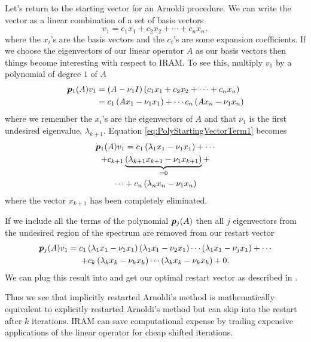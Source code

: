 Let's return to the starting vector for an Arnoldi procedure.  We can write the vector as a linear combination of a set of basis vectors
\begin{equation}
    v_1 = c_1x_1 + c_2x_2 + \cdots + c_nx_n,
\end{equation}
where the $x_i$'s are the basis vectors and the $c_i$'s are some expansion coefficients.  If we choose the eigenvectors of our linear operator $A$ as our basis vectors then things become interesting with respect to IRAM.  To see this, multiply $v_1$ by a polynomial of degree $1$ of $A$
\begin{equation}
    \begin{split}
        \bm{p}_1(A)v_1 &= \left(A-\nu_1I\right)\left(c_1x_1 + c_2x_2 + \cdots + c_nx_n\right) \\
         &= c_1\left(Ax_1 - \nu_1x_1\right) + \cdots c_n\left(Ax_n - \nu_1x_n\right)
    \end{split}
        \label{eq:PolyStartingVectorTerm1}
\end{equation}
where we remember the $x_i$'s are the eigenvectors of $A$ and that $\nu_1$ is the first undesired eigenvalue, $\lambda_{k+1}$.  Equation \eqref{eq:PolyStartingVectorTerm1} becomes
\begin{multline}
    \bm{p}_1(A)v_1 = c_1\left(\lambda_1x_1 - \nu_1x_1\right) + \cdots \\
    +c_{k+1}\underbrace{\left(\lambda_{k+1}x_{k+1} - \nu_1x_{k+1}\right)}_{=0} + \\
    \cdots + c_n\left(\lambda_nx_n - \nu_1x_n\right)
\end{multline}
where the vector $x_{k+1}$ has been completely eliminated.  

If we include all the terms of the polynomial $\bm{p}_j(A)$ then all $j$ eigenvectors from the undesired region of the spectrum are removed from our restart vector
\begin{multline}
    \bm{p}_j(A)v_1 = c_1\left(\lambda_1x_1 - \nu_1x_1\right)\left(\lambda_1x_1 - \nu_2x_1\right)\cdots\left(\lambda_1x_1 - \nu_jx_1\right) + \cdots \\
    + c_k\left(\lambda_kx_k - \nu_kx_k\right)\cdots\left(\lambda_kx_k - \nu_kx_k\right) + 0.
\end{multline}
We can plug this result into  and get our optimal restart vector as described in .

Thus we see that implicitly restarted Arnoldi's method is mathematically equivalent to explicitly restarted Arnoldi's method but can skip into the restart after $k$ iterations.  IRAM can save computational expense by trading expensive applications of the linear operator for cheap shifted \QR iterations.

